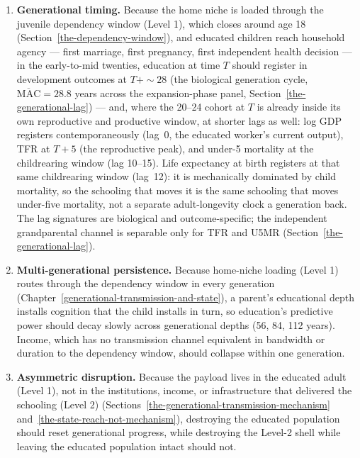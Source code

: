 \documentclass[12pt,letterpaper]{article}
\begin{document}
\begin{enumerate}
\item \textbf{Generational timing.} Because the home niche is
loaded through the juvenile dependency window (Level 1), which
closes around age 18 (Section~\ref{the-dependency-window}), and
educated children reach household agency --- first marriage,
first pregnancy, first independent health decision --- in the
early-to-mid twenties, education at time $T$ should register in
development outcomes at $T+{\sim}28$ (the biological generation
cycle, $\overline{\mathrm{MAC}} = 28.8$ years across the
expansion-phase panel, Section~\ref{the-generational-lag}) --- and,
where the 20--24 cohort at $T$ is already inside its own
reproductive and productive window, at shorter lags as well: log GDP
registers contemporaneously (lag~0, the educated worker's current
output), TFR at $T{+}5$ (the reproductive peak), and under-5
mortality at the childrearing window (lag 10--15). Life expectancy
at birth registers at that same childrearing window (lag~12): it is
mechanically dominated by child mortality, so the schooling that
moves it is the same schooling that moves under-five mortality, not a
separate adult-longevity clock a generation back. The lag signatures
are biological and outcome-specific; the independent grandparental
channel is separable only for TFR and U5MR
(Section~\ref{the-generational-lag}).\label{pred:timing}

\item \textbf{Multi-generational persistence.} Because home-niche
loading (Level 1) routes through the dependency window in every
generation
(Chapter~\ref{generational-transmission-and-state}), a parent's
educational depth installs cognition that the child installs in turn,
so education's predictive power should decay slowly across
generational depths (56, 84, 112 years). Income, which has no
transmission channel equivalent in bandwidth or duration to the
dependency window, should collapse within one
generation.\label{pred:persistence}

\item \textbf{Asymmetric disruption.} Because the payload lives in
the educated adult (Level 1), not in the institutions, income, or
infrastructure that delivered the schooling (Level 2)
(Sections~\ref{the-generational-transmission-mechanism}
and~\ref{the-state-reach-not-mechanism}), destroying the educated
population should reset generational progress, while destroying the
Level-2 shell while leaving the educated population intact should
not.\label{pred:disruption}


\end{enumerate}
\end{document}
